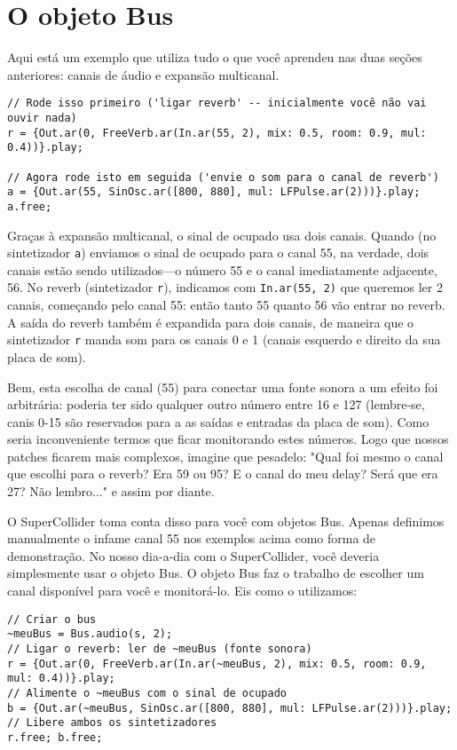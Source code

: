\section{O objeto Bus}
\label{sec:busobject}

Aqui está um exemplo que utiliza tudo o que você aprendeu nas duas seções anteriores: canais de áudio e expansão multicanal.
 
\begin{lstlisting}[style=SuperCollider-IDE, basicstyle=\scttfamily\footnotesize]
// Rode isso primeiro ('ligar reverb' -- inicialmente você não vai ouvir nada)
r = {Out.ar(0, FreeVerb.ar(In.ar(55, 2), mix: 0.5, room: 0.9, mul: 0.4))}.play;

// Agora rode isto em seguida ('envie o som para o canal de reverb')
a = {Out.ar(55, SinOsc.ar([800, 880], mul: LFPulse.ar(2)))}.play;
a.free;
\end{lstlisting}
 

Graças à expansão multicanal, o sinal de ocupado usa dois canais. Quando (no sintetizador \texttt{a}) enviamos o sinal de ocupado para o canal 55, na verdade, dois canais estão sendo utilizados---o número 55 e o canal imediatamente adjacente, 56. No reverb (sintetizador \texttt{r}), indicamos com \texttt{In.ar(55, 2)} que queremos ler 2 canais, começando pelo canal 55: então tanto 55 quanto 56 vão entrar no reverb. A saída do reverb também é expandida para dois canais, de maneira que o sintetizador \texttt{r} manda som para os canais 0 e 1 (canais esquerdo e direito da sua placa de som).

Bem, esta escolha de canal (55) para conectar uma fonte sonora a um efeito foi arbitrária: poderia ter sido qualquer outro número entre 16 e 127 (lembre-se, canis 0-15 são reservados para a as saídas e entradas da placa de som). Como seria inconveniente termos que ficar monitorando estes números. Logo que nossos patches ficarem mais complexos, imagine que pesadelo: "Qual foi mesmo o canal que escolhi para o reverb? Era 59 ou 95? E o canal do meu delay? Será que era 27? Não lembro..." e assim por diante.

O SuperCollider toma conta disso para você com objetos Bus. Apenas definimos manualmente o infame canal 55 nos exemplos acima como forma de demonstração. No nosso dia-a-dia com o SuperCollider, você deveria simplesmente usar o objeto Bus. O objeto Bus faz o trabalho de escolher um canal disponível para você e monitorá-lo. Eis como o utilizamos:

 
\begin{lstlisting}[style=SuperCollider-IDE, basicstyle=\scttfamily\footnotesize]
// Criar o bus
~meuBus = Bus.audio(s, 2);
// Ligar o reverb: ler de ~meuBus (fonte sonora)
r = {Out.ar(0, FreeVerb.ar(In.ar(~meuBus, 2), mix: 0.5, room: 0.9, mul: 0.4))}.play;
// Alimente o ~meuBus com o sinal de ocupado
b = {Out.ar(~meuBus, SinOsc.ar([800, 880], mul: LFPulse.ar(2)))}.play;
// Libere ambos os sintetizadores
r.free; b.free;
\end{lstlisting}
 

